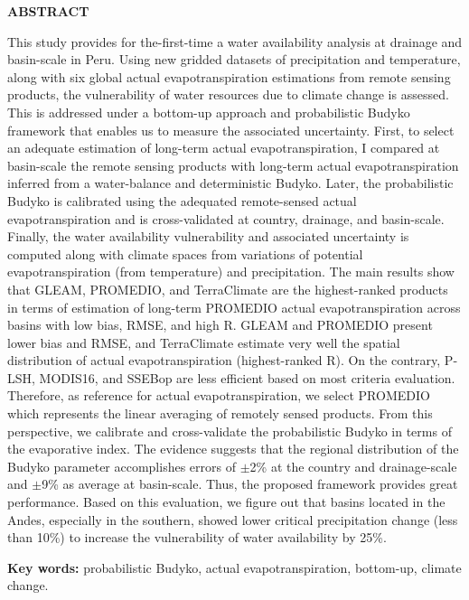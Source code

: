\clearpage

\begin{center}
\large{\textbf {ABSTRACT}}
\end{center}

This study provides for the-first-time a water availability analysis at drainage and basin-scale in Peru. Using new gridded datasets of precipitation and temperature, along with six global actual evapotranspiration estimations from remote sensing products, the vulnerability of water resources due to climate change is assessed. This is addressed under a bottom-up approach and probabilistic Budyko framework that enables us to measure the associated uncertainty. First, to select an adequate estimation of long-term actual evapotranspiration, I compared at basin-scale the remote sensing products with long-term actual evapotranspiration inferred from a water-balance and deterministic Budyko. Later, the probabilistic Budyko is calibrated using the adequated remote-sensed actual evapotranspiration and is cross-validated at country, drainage, and basin-scale. Finally, the water availability vulnerability and associated uncertainty is computed along with climate spaces from variations of potential evapotranspiration (from temperature) and precipitation. The main results show that GLEAM, PROMEDIO, and TerraClimate are the highest-ranked products in terms of estimation of long-term PROMEDIO actual evapotranspiration across basins with low bias, RMSE, and high R. GLEAM and PROMEDIO present lower bias and RMSE, and TerraClimate estimate very well the spatial distribution of actual evapotranspiration (highest-ranked R). On the contrary, P‐LSH, MODIS16, and SSEBop are less efficient based on most criteria evaluation. Therefore, as reference for actual evapotranspiration, we select PROMEDIO which represents the linear averaging of remotely sensed products. From this perspective, we calibrate and cross-validate the probabilistic Budyko in terms of the evaporative index. The evidence suggests that the regional distribution of the Budyko parameter accomplishes errors of $\pm$2\% at the country and drainage-scale and $\pm$9\% as average at basin-scale. Thus, the proposed framework provides great performance. Based on this evaluation, we figure out that basins located in the Andes, especially in the southern, showed lower critical precipitation change (less than 10\%) to increase the vulnerability of water availability by 25\%.

\textbf {Key words:} probabilistic Budyko, actual evapotranspiration, bottom-up, climate change.

\clearpage